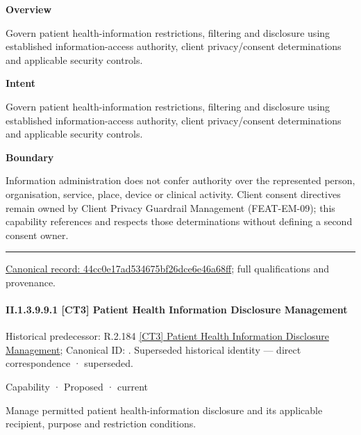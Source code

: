 \textbf{Overview}



Govern patient health-information restrictions, filtering and disclosure using established information-access authority, client privacy/consent determinations and applicable security controls.



\textbf{Intent}



Govern patient health-information restrictions, filtering and disclosure using established information-access authority, client privacy/consent determinations and applicable security controls.



\textbf{Boundary}



Information administration does not confer authority over the represented person, organisation, service, place, device or clinical activity. Client consent directives remain owned by Client Privacy Guardrail Management (FEAT-EM-09); this capability references and respects those determinations without defining a second consent owner.



\medskip\hrule\medskip

{\footnotesize \href{../../../../../../../continuum/strategy/capability/44cc0e17ad534675bf26dce6e46a68ff.md}{Canonical record: 44cc0e17ad534675bf26dce6e46a68ff}; full qualifications and provenance.}\par
\paragraph*{II.1.3.9.9.1 [CT3] Patient Health Information Disclosure Management}
\label{navigation:II.1.3.9.9.1}

{\small Historical predecessor: R.2.184 \hyperref[element:07cf507f183d4905a7ad2adbb8555df5]{[CT3] Patient Health Information Disclosure Management}; Canonical ID: \texttt{}. Superseded historical identity — direct correspondence · superseded.}\par
\label{element:7f918639e23842e78fa92f1bf47c5a7b}
{\small Capability · Proposed · current}\par

Manage permitted patient health-information disclosure and its applicable recipient, purpose and restriction conditions.




